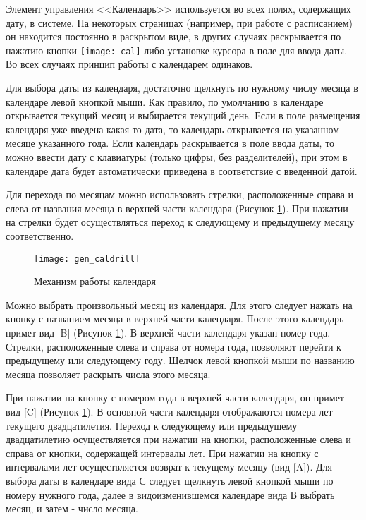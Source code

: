 Элемент управления <<Календарь>> используется во всех полях, содержащих дату, в системе. На некоторых страницах (например, при работе с расписанием) он находится постоянно в раскрытом виде, в других случаях раскрывается по нажатию кнопки \texttt{[image: cal]} либо установке курсора в поле для ввода даты. Во всех случаях принцип работы с календарем одинаков.

Для выбора даты из календаря, достаточно щелкнуть по нужному числу месяца в календаре левой кнопкой мыши.  Как правило, по умолчанию в календаре открывается текущий месяц и выбирается текущий день. Если в поле размещения календаря уже введена какая-то дата, то календарь открывается на указанном месяце указанного года. Если календарь раскрывается в поле ввода даты, то можно ввести дату с клавиатуры (только цифры, без разделителей), при этом в календаре дата будет автоматически приведена в соответствие с введенной датой.

Для перехода по месяцам можно использовать стрелки, расположенные справа и слева от названия месяца в верхней части календаря (Рисунок \ref{img_gen_caldrill}). При нажатии на стрелки будет осуществляться переход к следующему и предыдущему месяцу соответственно.

\begin{figure}[!ht]\centering
	\texttt{[image: gen\_caldrill]}
	\caption{Механизм работы календаря}
	\label{img_gen_caldrill}
\end{figure} 

Можно выбрать произвольный месяц из календаря. Для этого следует нажать на кнопку с названием месяца в верхней части календаря. После этого календарь примет вид [B] (Рисунок \ref{img_gen_caldrill}). В верхней части календаря указан номер года. Стрелки, расположенные слева и справа от номера года, позволяют перейти к предыдущему или следующему году. Щелчок левой кнопкой мыши по названию месяца позволяет раскрыть числа этого месяца.

При нажатии на кнопку с номером года в верхней части календаря, он примет вид [C] (Рисунок \ref{img_gen_caldrill}). В основной части календаря отображаются номера лет текущего двадцатилетия. Переход к следующему или предыдущему двадцатилетию осуществляется при нажатии на кнопки, расположенные слева и справа от кнопки, содержащей интервалы лет. При нажатии на кнопку с интервалами лет осуществляется возврат к текущему месяцу (вид [A]). Для выбора даты в календаре вида С следует щелкнуть левой кнопкой мыши по номеру нужного года, далее в видоизменившемся календаре вида В выбрать месяц, и затем - число месяца.
 
